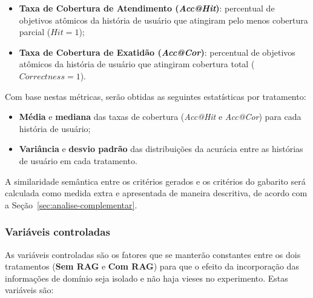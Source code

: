 \begin{itemize} 
    \item \textbf{Taxa de Cobertura de Atendimento (\textit{Acc@Hit})}: percentual de objetivos atômicos da história de usuário que atingiram pelo menos cobertura parcial ($Hit = 1$); 
    \item \textbf{Taxa de Cobertura de Exatidão (\textit{Acc@Cor})}: percentual de objetivos atômicos da história de usuário que atingiram cobertura total ($Correctness = 1$). 
\end{itemize} 
Com base nestas métricas, serão obtidas as seguintes estatísticas por tratamento: 
\begin{itemize} 
    \item \textbf{Média} e \textbf{mediana} das taxas de cobertura (\textit{Acc@Hit} e \textit{Acc@Cor}) para cada história de usuário; 
    \item \textbf{Variância} e \textbf{desvio padrão} das distribuições da acurácia entre as histórias de usuário em cada tratamento. 
\end{itemize}

A similaridade semântica entre os critérios gerados e os critérios do gabarito será calculada como medida extra e apresentada de maneira descritiva, de acordo com a Seção~\ref{sec:analise-complementar}.

\subsubsection*{Variáveis controladas}
As variáveis controladas são os fatores que se manterão constantes entre os dois tratamentos (\textbf{Sem RAG} e \textbf{Com RAG}) para que o efeito da incorporação das informações de domínio seja isolado e não haja vieses no experimento.
Estas variáveis são:



